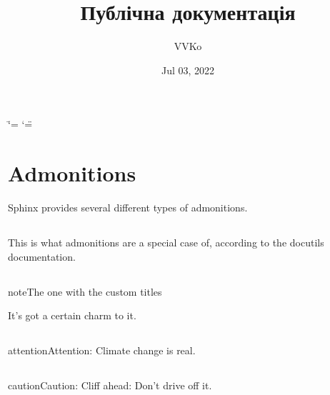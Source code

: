 \documentclass[a4paper,10pt,english]{sphinxmanual}
\title{Публічна документація}
\date{Jul 03, 2022}
\author{VVKo}
\begin{document}
\ifdefined\shorthandoff
  \ifnum\catcode`\=\string=\active\shorthandoff{=}\fi
  \ifnum\catcode`\"=\active{}\fi
\fi

\pagestyle{empty}
\sphinxmaketitle
\pagestyle{plain}
\sphinxtableofcontents
\pagestyle{normal}
\label{\detokenize{index::doc}}


\sphinxstepscope


\chapter{Admonitions}
\label{\detokenize{test:admonitions}}\label{\detokenize{test::doc}}
\sphinxAtStartPar
Sphinx provides several different types of admonitions.


\section{}
\label{\detokenize{test:topic}}
\begin{sphinxShadowBox}

\sphinxAtStartPar
This is what admonitions are a special case of, according to the docutils
documentation.
\end{sphinxShadowBox}


\section{}
\label{\detokenize{test:admonition}}
\begin{sphinxadmonition}{note}{The one with the custom titles}

\sphinxAtStartPar
It’s got a certain charm to it.
\end{sphinxadmonition}


\section{}
\label{\detokenize{test:attention}}
\begin{sphinxadmonition}{attention}{Attention:}
\sphinxAtStartPar
Climate change is real.
\end{sphinxadmonition}


\section{}
\label{\detokenize{test:caution}}
\begin{sphinxadmonition}{caution}{Caution:}
\sphinxAtStartPar
Cliff ahead: Don’t drive off it.
\end{sphinxadmonition}
\end{document}
